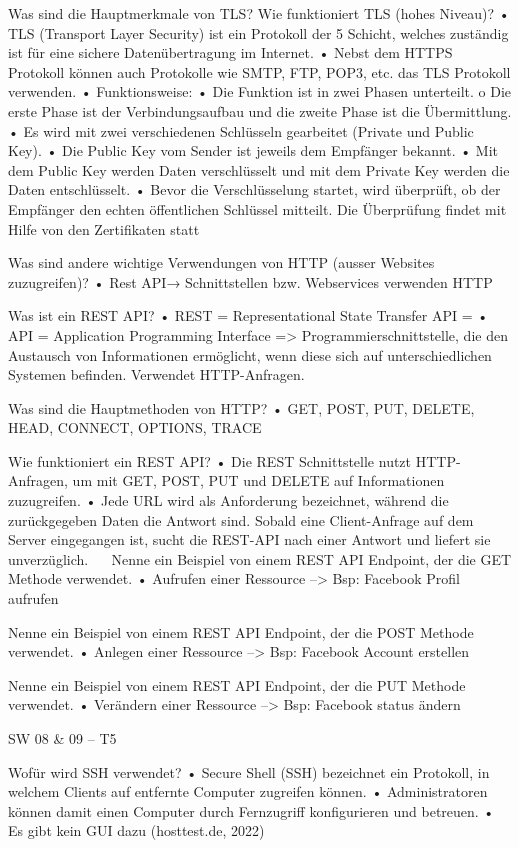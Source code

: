 \begin{itemize}
Was sind die Hauptmerkmale von TLS? Wie funktioniert TLS (hohes Niveau)?
•	TLS (Transport Layer Security) ist ein Protokoll der 5 Schicht, welches zuständig ist für eine sichere Datenübertragung im Internet. 
•	Nebst dem HTTPS Protokoll können auch Protokolle wie SMTP, FTP, POP3, etc. das TLS Protokoll verwenden. 
•	Funktionsweise: 
•	Die Funktion ist in zwei Phasen unterteilt. 
o	Die erste Phase ist der Verbindungsaufbau und die zweite Phase ist die Übermittlung.
•	Es wird mit zwei verschiedenen Schlüsseln gearbeitet (Private und Public Key). 
•	Die Public Key vom Sender ist jeweils dem Empfänger bekannt. 
•	Mit dem Public Key werden Daten verschlüsselt und mit dem Private Key werden die Daten entschlüsselt. 
•	Bevor die Verschlüsselung startet, wird überprüft, ob der Empfänger den echten öffentlichen Schlüssel mitteilt. Die Überprüfung findet mit Hilfe von den Zertifikaten statt

Was sind andere wichtige Verwendungen von HTTP (ausser Websites zuzugreifen)?
•	Rest API→ Schnittstellen bzw. Webservices verwenden HTTP

Was ist ein REST API?
•	REST = Representational State Transfer API = 
•	API = Application Programming Interface => Programmierschnittstelle, die den Austausch von Informationen ermöglicht, wenn diese sich auf unterschiedlichen Systemen befinden. Verwendet HTTP-Anfragen.

Was sind die Hauptmethoden von HTTP?
•	GET, POST, PUT, DELETE, HEAD, CONNECT, OPTIONS, TRACE

Wie funktioniert ein REST API?
•	Die REST Schnittstelle nutzt HTTP-Anfragen, um mit GET, POST, PUT und DELETE auf Informationen zuzugreifen. 
•	Jede URL wird als Anforderung bezeichnet, während die zurückgegeben Daten die Antwort sind. Sobald eine Client-Anfrage auf dem Server eingegangen ist, sucht die REST-API nach einer Antwort und liefert sie unverzüglich.
 
Nenne ein Beispiel von einem REST API Endpoint, der die GET Methode verwendet.
•	Aufrufen einer Ressource --> Bsp: Facebook Profil aufrufen

Nenne ein Beispiel von einem REST API Endpoint, der die POST Methode verwendet.
•	Anlegen einer Ressource --> Bsp: Facebook Account erstellen

Nenne ein Beispiel von einem REST API Endpoint, der die PUT Methode verwendet.
•	Verändern einer Ressource --> Bsp: Facebook status ändern

SW 08 & 09 – T5 

Wofür wird SSH verwendet?
•	Secure Shell (SSH) bezeichnet ein Protokoll, in welchem Clients auf entfernte Computer zugreifen können. 
•	Administratoren können damit einen Computer durch Fernzugriff konfigurieren und betreuen.
•	Es gibt kein GUI dazu (hosttest.de, 2022)


\end{itemize}
